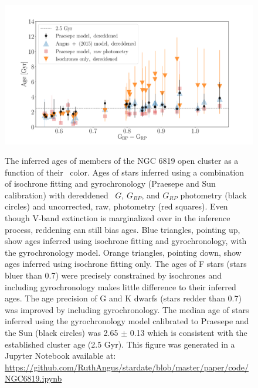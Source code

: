 \begin{figure}
  \caption{
    The inferred ages of members of the NGC 6819 open cluster as a function of
    their \gcolor\ color.
    Ages of stars inferred using a combination of isochrone fitting and
    gyrochronology (Praesepe and Sun calibration) with dereddened \gaia\ $G$,
    $G_{BP}$, and $G_{RP}$ photometry (black circles) and uncorrected, raw,
    photometry (red squares).
    Even though V-band extinction is marginalized over in the inference
    process, reddening can still bias ages.
    Blue triangles, pointing up, show ages inferred using isochrone fitting
    and gyrochronology, with the \citet{angus2015} gyrochronology model.
    Orange triangles, pointing down, show ages inferred using isochrone
    fitting only.
    The ages of F stars (stars bluer than 0.7) were precisely constrained by
    isochrones and including gyrochronology makes little difference to their
    inferred ages.
    The age precision of G and K dwarfs (stars redder than 0.7) was improved
    by including gyrochronology.
    The median age of stars inferred using the gyrochronology model
    calibrated to Praesepe and the Sun (black circles) was 2.65 $\pm$ 0.13
    which is consistent with the established cluster age (2.5 Gyr).
    This figure was generated in a Jupyter Notebook available at:
    \url{https://github.com/RuthAngus/stardate/blob/master/paper/code/NGC6819.ipynb}
}
  \centering
    \includegraphics[width=1\textwidth]{NGC6819_results}
\label{fig:NGC6819_results}
\end{figure}

